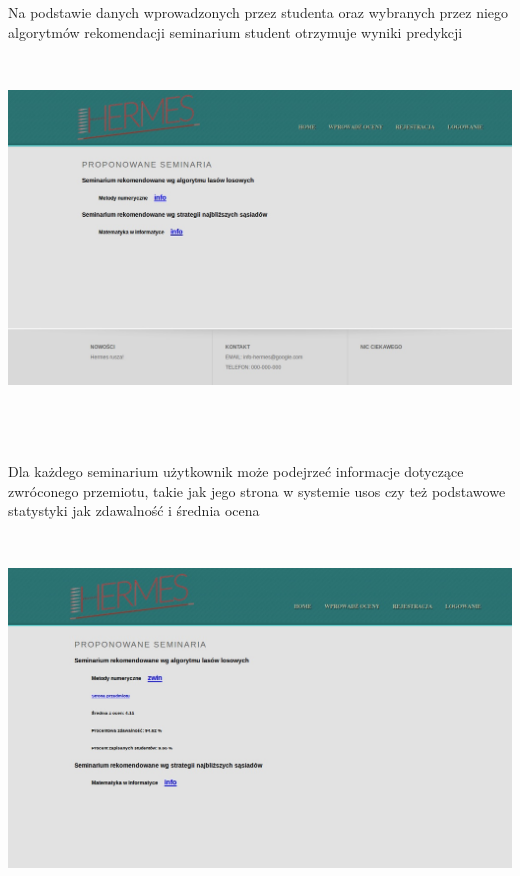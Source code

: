 \documentclass[licencjacka]{pracamgr}
\begin{document}
Na podstawie danych wprowadzonych przez studenta oraz wybranych przez niego algorytmów rekomendacji seminarium student otrzymuje wyniki predykcji \par
~\\
\begin{minipage}{\linewidth}
	\centering
           \includegraphics[scale=0.5]{rekSemResult.jpg}
\end{minipage} \\  \\ \\
Dla każdego seminarium użytkownik może podejrzeć informacje dotyczące zwróconego przemiotu, takie jak jego strona w systemie usos czy też podstawowe statystyki jak zdawalność i średnia ocena \par
~\\
\begin{minipage}{\linewidth}
	\centering
           \includegraphics[scale=0.5]{rekSemResultInfo.jpg}
\end{minipage} \\ 
\end{document}
